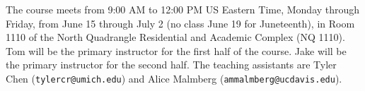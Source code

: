 The course meets from 9:00 AM to 12:00 PM US Eastern Time, Monday
through Friday, from June 15 through July 2 (no class June 19 for
Juneteenth), in Room 1110 of the North Quadrangle Residential and
Academic Complex (NQ 1110). Tom will be the primary instructor for the first half of the
course. Jake will be the primary instructor for the second half.  The
teaching assistants are Tyler Chen
(\texttt{tylercr@umich.edu}) and Alice Malmberg
(\texttt{ammalmberg@ucdavis.edu}).


